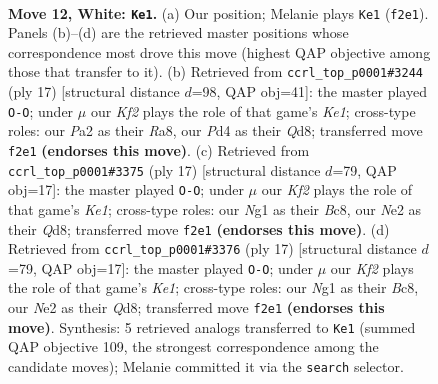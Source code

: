 \documentclass[11pt]{article}
\begin{document}
\clearpage

\begin{figure}[p]\centering
\begin{subfigure}{0.46\textwidth}\centering
\resizebox{\linewidth}{!}{%
\newchessgame
\chessboard[
  setfen={rnb2rk1/2pnqppp/pp2p3/3pP3/3P1P1P/8/PPP1NKP1/1R1Q1BNR w - - 2 12},
  showmover=false,
  pgfstyle=straightmove, color=movearrow, markmove={f2-e1}
]}
\caption{}
\end{subfigure}\hfill
\begin{subfigure}{0.46\textwidth}\centering
\resizebox{\linewidth}{!}{%
\newchessgame
\chessboard[
  setfen={r1bqk2r/pp1n1ppp/2p2n2/4p3/P1p5/R4NP1/1PQPPPBP/2B2RK1 b kq - 0 9},
  showmover=false,
  pgfstyle=straightmove, color=movearrow, markmove={e8-g8}
]}
\caption{}
\end{subfigure}
\\[4pt]
\begin{subfigure}{0.46\textwidth}\centering
\resizebox{\linewidth}{!}{%
\newchessgame
\chessboard[
  setfen={r1bqk2r/1ppn1ppp/4pn2/p7/2pP4/P4NP1/1P1QPPBP/RN3RK1 b kq - 2 9},
  showmover=false,
  pgfstyle=straightmove, color=movearrow, markmove={e8-g8}
]}
\caption{}
\end{subfigure}\hfill
\begin{subfigure}{0.46\textwidth}\centering
\resizebox{\linewidth}{!}{%
\newchessgame
\chessboard[
  setfen={r1bqk2r/1ppn1ppp/4pn2/p7/2pP4/P4NP1/1P1QPPBP/RN3RK1 b kq - 2 9},
  showmover=false,
  pgfstyle=straightmove, color=movearrow, markmove={e8-g8}
]}
\caption{}
\end{subfigure}
\caption{\textbf{Move 12, White: \texttt{Ke1}.} (a) Our position; Melanie plays \texttt{Ke1} (\texttt{f2e1}). Panels (b)--(d) are the retrieved master positions whose correspondence most drove this move (highest QAP objective among those that transfer to it). (b) Retrieved from \texttt{ccrl\_top\_p0001\#3244} (ply 17) [structural distance $d$=98, QAP obj=41]: the master played \texttt{O-O}; under $\mu$ our \emph{Kf2} plays the role of that game's \emph{Ke1}; cross-type roles: our \emph{P}a2 as their \emph{R}a8, our \emph{P}d4 as their \emph{Q}d8; transferred move \texttt{f2e1} \textbf{(endorses this move)}. (c) Retrieved from \texttt{ccrl\_top\_p0001\#3375} (ply 17) [structural distance $d$=79, QAP obj=17]: the master played \texttt{O-O}; under $\mu$ our \emph{Kf2} plays the role of that game's \emph{Ke1}; cross-type roles: our \emph{N}g1 as their \emph{B}c8, our \emph{N}e2 as their \emph{Q}d8; transferred move \texttt{f2e1} \textbf{(endorses this move)}. (d) Retrieved from \texttt{ccrl\_top\_p0001\#3376} (ply 17) [structural distance $d$=79, QAP obj=17]: the master played \texttt{O-O}; under $\mu$ our \emph{Kf2} plays the role of that game's \emph{Ke1}; cross-type roles: our \emph{N}g1 as their \emph{B}c8, our \emph{N}e2 as their \emph{Q}d8; transferred move \texttt{f2e1} \textbf{(endorses this move)}. Synthesis: 5 retrieved analogs transferred to \texttt{Ke1} (summed QAP objective 109, the strongest correspondence among the candidate moves); Melanie committed it via the \texttt{search} selector.}
\label{fig:thought-m22}
\end{figure}
\end{document}
